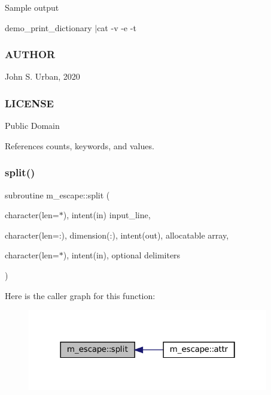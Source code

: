 Sample output

demo\+\_\+print\+\_\+dictionary $\vert$cat -\/v -\/e -\/t

\subsubsection*{A\+U\+T\+H\+OR}

John S. Urban, 2020

\subsubsection*{L\+I\+C\+E\+N\+SE}

Public Domain 

References counts, keywords, and values.

\mbox{\label{namespacem__escape_af23bd97702864e0f32258e6ec0d51506}} 
\subsubsection{\texorpdfstring{split()}{split()}}
{\footnotesize\ttfamily subroutine m\+\_\+escape\+::split (\begin{DoxyParamCaption}\item[{character(len=$\ast$), intent(in)}]{input\+\_\+line,  }\item[{character(len=\+:), dimension(\+:), intent(out), allocatable}]{array,  }\item[{character(len=$\ast$), intent(in), optional}]{delimiters }\end{DoxyParamCaption})\hspace{0.3cm}{\ttfamily [private]}}

Here is the caller graph for this function\+:\nopagebreak
\begin{figure}[H]
\begin{center}
\leavevmode
\includegraphics[width=298pt]{namespacem__escape_af23bd97702864e0f32258e6ec0d51506_icgraph}
\end{center}
\end{figure}
\mbox{\label{namespacem__escape_a5efd612f60d281003917329484a7960c}} 
